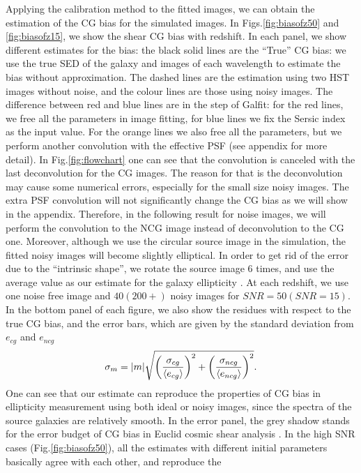 \documentclass[useAMS,usenatbib]{mn2e}
\newcommand{\be}{\begin{equation}}
\newcommand{\ee}{\end{equation}}
\newcommand{\rund}[1]{\left(#1\right)}
\def\elabel#1{\label{eq:#1}}
\begin{document}
Applying the calibration method to the fitted images, we can obtain
the estimation of the CG bias for the simulated images. In
Figs.\ref{fig:biasofz50} and \ref{fig:biasofz15}, we show the shear CG
bias with redshift. In each panel, we show different estimates for the
bias: the black solid lines are the ``True'' CG bias: we use the true
SED of the galaxy and images of each wavelength to estimate the bias
without approximation. The dashed lines are the estimation using two
HST images without noise, and the colour lines are those using noisy
images. The difference between red and blue lines are in the step of
Galfit: for the red lines, we free all the parameters in image
fitting, for blue lines we fix the Sersic index as the input
value. For the orange lines we also free all the parameters, but we
perform another convolution with the effective PSF (see appendix for
more detail).  In Fig.\ref{fig:flowchart} one can see that the
convolution is canceled with the last deconvolution for the CG images.
The reason for that is the deconvolution may cause some numerical
errors, especially for the small size noisy images. The extra PSF
convolution will not significantly change the CG bias as we will show
in the appendix. Therefore, in the following result for noise images,
we will perform the convolution to the NCG image instead of
deconvolution to the CG one.
%
Moreover, although we use the circular source image in the simulation,
the fitted noisy images will become slightly elliptical. In order to
get rid of the error due to the ``intrinsic shape'', we rotate the
source image $6$ times, and use the average value as our estimate for
the galaxy ellipticity \citep{2007AJ....133.1763N}. At each redshift,
we use one noise free image and $40 (200+)$ noisy images for $SNR=50
(SNR=15)$.  In the bottom panel of each figure, we also show the
residues with respect to the true CG bias, and the error bars, which
are given by the standard deviation from $e_{cg}$ and $e_{ncg}$
%
\be
\sigma_m= |m| \sqrt{\rund{\sigma_{cg} \over \langle e_{cg}\rangle }^2
  + \rund{\sigma_{ncg} \over \langle e_{ncg} \rangle}^2 }.
\elabel{sigmam}
\ee
%
One can see that our estimate can reproduce the properties of CG bias
in ellipticity measurement using both ideal or noisy images, since the
spectra of the source galaxies are relatively smooth. In the error
panel, the grey shadow stands for the error budget of CG bias in
Euclid cosmic shear analysis \citep[$\pm
  0.00025$][]{2013MNRAS.431.3103C,2013MNRAS.429..661M}. In the high
SNR cases (Fig.\ref{fig:biasofz50}), all the estimates with different
initial parameters basically agree with each other, and reproduce the
\end{document}
